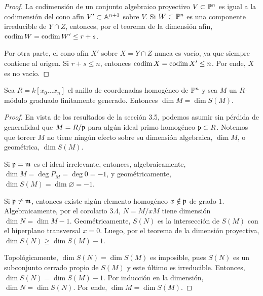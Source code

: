 \begin{proof}
La codimensión de un conjunto algebraico proyectivo $V \subset \P^n$ es igual a la codimensión del cono afín $V' \subset \A^{n+1}$ sobre $V$. Si $W \subset \P^n$ es una componente irreducible de $Y \cap Z$, entonces, por el teorema de la dimensión afín, $\codim W = \codim W' \le r + s$.

Por otra parte, el cono afín $X'$ sobre $X = Y \cap Z$ nunca es vacío, ya que siempre contiene al origen. Si $r + s \le n$, entonces $\codim X = \codim X' \le n$. Por ende, $X$ es no vacío.
\end{proof}

\begin{proposition}
Sea $R = k[x_0 \dots x_n]$ el anillo de coordenadas homogéneo de $\P^n$ y sea $M$ un $R$-módulo graduado finitamente generado. Entonces $\dim M = \dim S(M)$.
\end{proposition}

\begin{proof}
En vista de los resultados de la sección 3.5, podemos asumir sin pérdida de generalidad que $M = R/\p$ para algún ideal primo homogéneo $\p \subset R$. Notemos que torcer $M$ no tiene ningún efecto sobre su dimensión algebraica, $\dim M$, o geométrica, $\dim S(M)$.

Si $\p = \m$ es el ideal irrelevante, entonces, algebraicamente, $\dim M = \deg P_M = \deg 0 = -1$, y geométricamente, $\dim S(M) = \dim \varnothing = -1$.

Si $\p \ne \m$, entonces existe algún elemento homogéneo $x \notin \p$ de grado $1$. Algebraicamente, por el corolario 3.4, $N = M/xM$ tiene dimensión $\dim N = \dim M - 1$. Geométricamente, $S(N)$ es la intersección de $S(M)$ con el hiperplano transversal $x = 0$. Luego, por el teorema de la dimensión proyectiva, $\dim S(N) \ge \dim S(M) - 1$.

Topológicamente, $\dim S(N) = \dim S(M)$ es imposible, pues $S(N)$ es un subconjunto cerrado propio de $S(M)$ y este último es irreducible. Entonces, $\dim S(N) = \dim S(M) - 1$. Por inducción en la dimensión, $\dim N = \dim S(N)$. Por ende, $\dim M = \dim S(M)$.
\end{proof}
